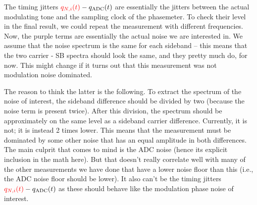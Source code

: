 \documentclass[11pt]{article}
\begin{document}
The timing jitters ${\color{red}q_{N,i}(t)}- q_{\text{ADC}}(t)$ are essentially the jitters between the actual modulating tone and the sampling clock of the phasemeter. To check their level in the final result, we could repeat the measurement with different frequencies. Now, the purple terms are essentially the actual noise we are interested in. We assume that the noise spectrum is the same for each sideband -- this means that the two carrier - SB spectra should look the same, and they pretty much do, for now. This might change if it turns out that this measurement was not modulation noise dominated. 

The reason to think the latter is the following. To extract the spectrum of the noise of interest, the sideband difference should be divided by two (because the noise term is present twice). After this division, the spectrum should be approximately on the same level as a sideband carrier difference. Currently, it is not; it is instead 2 times lower. This means that the measurement must be dominated by some other noise that has an equal amplitude in both differences. The main culprit that comes to mind is the ADC noise (hence its explicit inclusion in the math here). But that doesn't really correlate well with many of the other measurements we have done that have a lower noise floor than this (i.e., the ADC noise floor should be lower). It also can't be the timing jitters ${\color{red}q_{N,i}(t)}- q_{\text{ADC}}(t)$ as these should behave like the modulation phase noise of interest. 
\end{document}
